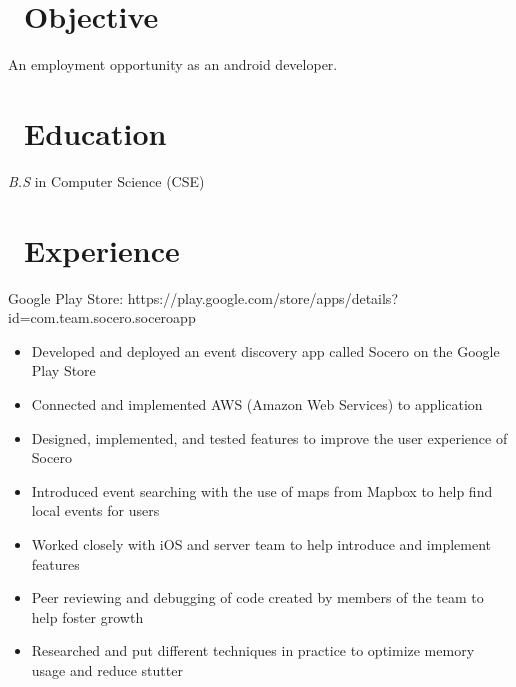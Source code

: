 \documentclass{resume}
\begin{document}



\section{\faSearch\ Objective}
An employment opportunity as an android developer.

\section{\faGraduationCap\ Education}
\textit{B.S} in Computer Science (CSE)

\section{\faUsers\ Experience}

Google Play Store: {\color{blue}https://play.google.com/store/apps/details?id=com.team.socero.soceroapp}
\begin{itemize}
  \item Developed and deployed an event discovery app called Socero on the Google Play Store 
  \item Connected and implemented AWS (Amazon Web Services) to application
  \item Designed, implemented, and tested features to improve the user experience of Socero
  \item Introduced event searching with the use of maps from Mapbox to help find local events for users
  \item Worked closely with iOS and server team to help introduce and implement features
  \item Peer reviewing and debugging of code created by members of the team to help foster growth
  \item Researched and put different techniques in practice to optimize memory usage and reduce stutter
\end{itemize}
\end{document}
